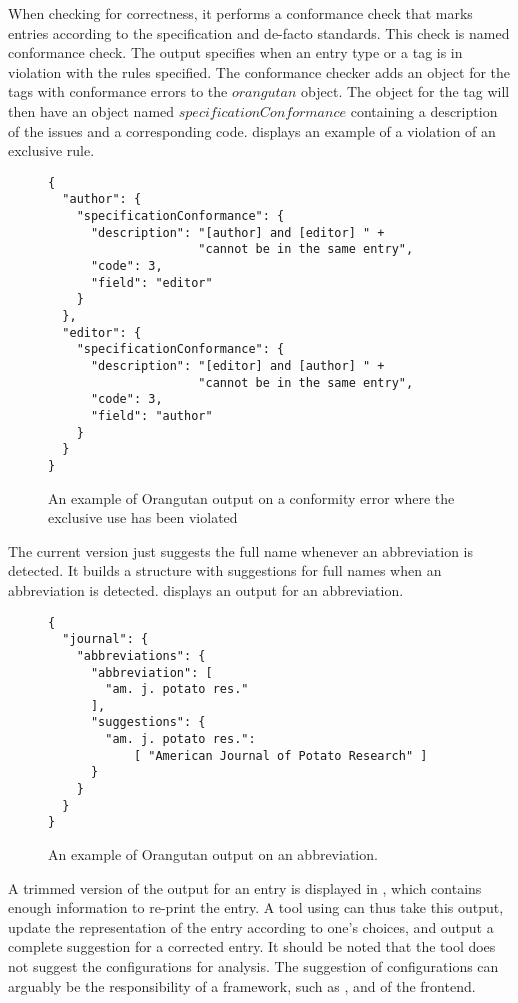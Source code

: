 
When checking for correctness, it performs a conformance check that
marks entries according to the {\bibtex} specification and de-facto
standards.  This check is named conformance check.  The output
specifies when an entry type or a tag is in violation with the rules
specified.  The conformance checker adds an object for the tags with
conformance errors to the $orangutan$ object.  The object for the tag
will then have an object named $specificationConformance$ containing a
description of the issues and a corresponding code.
 displays an example of a violation
of an exclusive rule.

\begin{figure}
  \centering
\begin{verbatim}
{
  "author": {
    "specificationConformance": {
      "description": "[author] and [editor] " +
                     "cannot be in the same entry",
      "code": 3,
      "field": "editor"
    }
  },
  "editor": {
    "specificationConformance": {
      "description": "[editor] and [author] " +
                     "cannot be in the same entry",
      "code": 3,
      "field": "author"
    }
  }
}
\end{verbatim}
\caption{An example of Orangutan output on a conformity error where
  the exclusive use has been violated}
\label{fig:orgazing_nonconformity}
\end{figure}

The current version just suggests the full name whenever an
abbreviation is detected.  It builds a structure with suggestions for
full names when an abbreviation is
detected.  displays an {\orangutan}
output for an abbreviation.

\begin{figure}
  \centering
\begin{verbatim}
{
  "journal": {
    "abbreviations": {
      "abbreviation": [
        "am. j. potato res."
      ],
      "suggestions": {
        "am. j. potato res.":
            [ "American Journal of Potato Research" ]
      }
    }
  }
}
\end{verbatim}
\caption{An example of Orangutan output on an abbreviation.}
\label{fig:orgazing_abbreviation}
\end{figure}

A trimmed version of the output for an entry is displayed in
, which contains enough information to
re-print the entry.  A tool using {\orangutan} can thus take this
output, update the representation of the entry according to one's
choices, and output a complete suggestion for a corrected entry.  It
should be noted that the tool does not suggest the configurations for
analysis.  The suggestion of configurations can arguably be the
responsibility of a framework, such as {\orangutan}, and of the
frontend.

